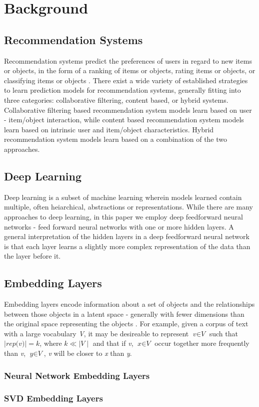 \section{Background}
\subsection{Recommendation Systems}
Recommendation systems predict the preferences of users in regard to new items or objects, in the form of a ranking of items or objects, rating items or objects, or classifying items or objects \cite{DBLP:journals/corr/ZhangYS17aa}. There exist a wide variety of established strategies to learn prediction models for recommendation systems, generally fitting into three categories: collaborative filtering, content based, or hybrid systems. Collaborative filtering based recommendation system models learn based on user - item/object interaction, while content based recommendation system models learn based on intrinsic user and item/object characteristics. Hybrid recommendation system models learn based on a combination of the two approaches.  
\subsection{Deep Learning}
Deep learning is a subset of machine learning wherein models learned contain multiple, often heiarchical, abstractions or representations. While there are many approaches to deep learning, in this paper we employ deep feedforward neural networks - feed forward neural networks with one or more hidden layers. A general interpretation of the hidden layers in a deep feedforward neural network is that each layer learns a slightly more complex representation of the data than the layer before it.
\subsection{Embedding Layers}
Embedding layers encode information about a set of objects and the relationships between those objects in a latent space - generally with fewer dimensions than the original space representing the objects \cite{DBLP:journals/corr/abs-1301-3781}. For example, given a corpus of text with a large vocabulary \textit{V}, it may be desireable to represent $\textit{v}\in\textit{V}$ such that $\mid\textit{rep(v)}\mid=\textit{k}$, where $\textit{k}\ll\mid\textit{V}\mid$ and that if \textit{v}, $\textit{x}\in\textit{V}$ occur together more frequently than \textit{v}, $\textit{y}\in\textit{V}$, \textit{v} will be closer to \textit{x} than \textit{y}.
\subsubsection{Neural Network Embedding Layers}

\subsubsection{SVD Embedding Layers}